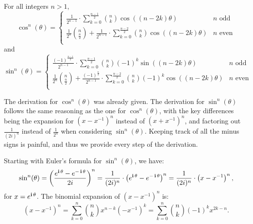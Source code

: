 \begin{tcolorbox}[title=\textcolor{black}{Proof of Prop.~\ref{thm:ReducingPowersCosineSine} Reducing Powers of Sine and Cosine}, sharp corners, colback=green!30, colframe=green!80!blue, breakable, fonttitle=\bfseries]
For all integers $n>1$,
 \begin{equation}
 \label{eq:BinomialForCosXV02}
\cos^n(\theta) = \begin{cases} \displaystyle
    \frac{1}{2^{n-1}} \cdot \sum_{k=0}^{ \frac{n-1}{2} }\binom{n}{k} \cos\left( (n-2k) \theta \right) & n \text{ odd} \\[1em]  \displaystyle
  \frac{1}{2^n} \binom{n}{\frac{n}{2}} +  \frac{1}{2^{n-1}} \cdot \sum_{k=0}^{ \frac{n-2}{2} } \binom{n}{k} \cos\left( (n-2k) \theta \right)  & n \text{ even} \\
\end{cases}    
\end{equation}   
and
\begin{equation}
\label{eq:BinomialForSinXV02}
\sin^n(\theta) = \begin{cases} \displaystyle
    \frac{(-1)^{\frac{n-1}{2}}}{2^{n-1}} \cdot \sum_{k=0}^{\frac{n-1}{2}} \binom{n}{k} (-1)^k \sin\left((n-2k) \theta \right) & n \text{ odd} \\[1em]  \displaystyle
 \frac{1}{2^n} \binom{n}{\frac{n}{2}} + \frac{(-1)^{\frac{n}{2}}}{2^{n-1}}  \cdot\sum_{k=0}^{\frac{n-2}{2}} \binom{n}{k} (-1)^k \cos\left((n-2k) \theta \right)  & n \text{ even} \\
\end{cases}    
\end{equation}
\bigskip
\end{tcolorbox}

The derivation for $\cos^n(\theta)$ was already given. The derivation for \( \sin^n(\theta) \) follows the same reasoning as 
the one for \( \cos^n(\theta) \), with the key differences being the expansion for \( (x - x^{-1})^n \) instead of 
\( (x + x^{-1})^n \), and factoring out \( \frac{1}{(2i)^n} \) instead of \( \frac{1}{2^n} \) when considering  $\sin^n(\theta)$. Keeping track of all the minus signs is painful, and thus we provide every step of the derivation.

Starting with Euler's formula for \(\sin^n(\theta)\), we have:
\begin{equation}
\label{eq:SinePreppedForBinomialTheorem}
    \sin^n(\theta) = \left( \frac{ e^{\mathop{\bm{\mathrm i}} \theta} - e^{-\mathop{\bm{\mathrm i}} \theta} }{2i} \right)^n =
\frac{1}{(2i)^n} \cdot \left( e^{\mathop{\bm{\mathrm i}} \theta} - e^{-\mathop{\bm{\mathrm i}} \theta}  \right)^n =
\frac{1} {(2i)^n} \cdot \left( x - x^{-1}  \right)^n,
\end{equation}
for \(x =e^{\mathop{\bm{\mathrm i}} \theta}\). The binomial expansion of \( \left(x - x^{-1}\right)^n \) is:
\begin{equation}
    \left(x -  x^{-1}\right)^n = \sum_{k=0}^{n} \binom{n}{k} x^{n-k} (-x^{-1})^k = \sum_{k=0}^{n} \binom{n}{k} (-1)^k x^{2k-n}.
\end{equation}

